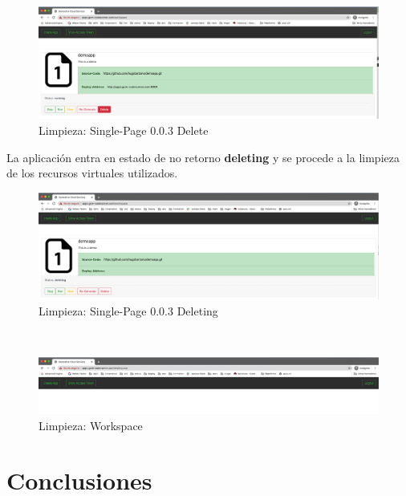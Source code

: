 \documentclass[a4paper,11pt]{book}
\begin{document}
   \begin{figure}[H]
\centering
\includegraphics[scale=0.25]{imagenes/casouso/5_1_a.png}
\caption{  Limpieza: Single-Page 0.0.3 Delete }
\end{figure}

La aplicación entra en estado de no retorno \textbf{deleting} y se procede  a la limpieza de los recursos virtuales utilizados. 

   \begin{figure}[H]
\centering
\includegraphics[scale=0.25]{imagenes/casouso/5_2_a.png}
\caption{  Limpieza: Single-Page 0.0.3 Deleting }
\end{figure}

~\\

   \begin{figure}[H]
\centering
\includegraphics[scale=0.25]{imagenes/casouso/5_3_a.png}
\caption{ Limpieza: Workspace  }
\end{figure}


\chapter{Conclusiones}
\end{document}

